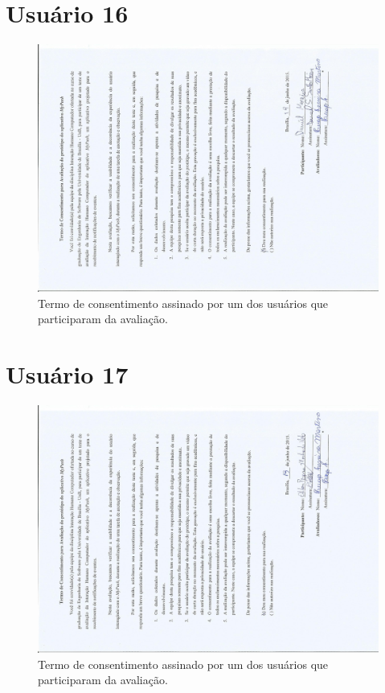 \begin{anexosenv}
    \section*{Usuário 16}
    \begin{figure}[!htbp]
      \centering
      \includegraphics[scale=0.6, angle=-90]{editaveis/figuras/daniel}
      \caption{Termo de consentimento assinado por um dos usuários que participaram da avaliação.}
      \label{termo_consentimento_1}
    \end{figure}
    
    \section*{Usuário 17}
    \begin{figure}[!htbp]
      \centering
      \includegraphics[scale=0.6, angle=-90]{editaveis/figuras/odilon}
      \caption{Termo de consentimento assinado por um dos usuários que participaram da avaliação.}
      \label{termo_consentimento_1}
    \end{figure}
    

\end{anexosenv}
